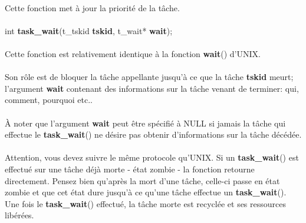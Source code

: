 \documentclass[10pt,a4wide]{article}
\begin{document}
\paragraph{}

Cette fonction met \`a jour la priorit\'e de la t\^ache.

\paragraph{}

\hspace{1.5cm}int \textbf{task\_wait}(t\_tskid \textbf{tskid},
                                      t\_wait* \textbf{wait});

\paragraph{}

Cette fonction est relativement identique \`a la fonction \textbf{wait}()
d'UNIX.

\paragraph{}

Son r\^ole est de bloquer la t\^ache appellante jusqu'\`a ce que la
t\^ache \textbf{tskid} meurt; l'argument \textbf{wait} contenant des
informations sur la t\^ache venant de terminer: qui, comment, pourquoi etc..

\paragraph{}

\`A noter que l'argument \textbf{wait} peut \^etre sp\'ecifi\'e \`a NULL
si jamais la t\^ache qui effectue le \textbf{task\_wait}() ne d\'esire
pas obtenir d'informations sur la t\^ache d\'ec\'ed\'ee.

\paragraph{}

Attention, vous devez suivre le m\^eme protocole qu'UNIX. Si un
\textbf{task\_wait}() est effectu\'e sur une t\^ache d\'ej\`a morte -
\'etat zombie - la fonction retourne directement. Pensez bien qu'apr\`es
la mort d'une t\^ache, celle-ci passe en \'etat zombie et que cet \'etat
dure jusqu'\`a ce qu'une t\^ache effectue un \textbf{task\_wait}(). Une fois
le \textbf{task\_wait}() effectu\'e, la t\^ache morte est recycl\'ee
et ses ressources lib\'er\'ees.
\end{document}
